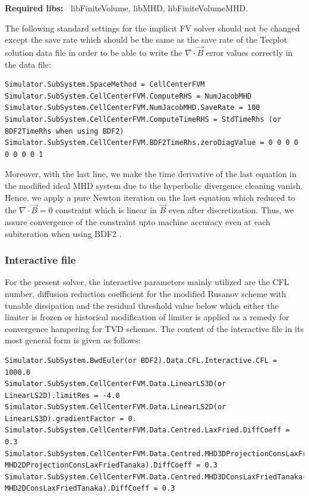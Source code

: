 \documentclass[11pt]{article}
\begin{document}
{\bf Required libs:~} libFiniteVolume, libMHD, libFiniteVolumeMHD.

The following standard settings for the implicit FV solver should not be changed except the save rate which should be the same as the save rate of the Tecplot solution data file in order to be able to write the $\nabla\cdot\vec{B}$ error values correctly in the data file:

\begin{lstlisting}[breaklines]
Simulator.SubSystem.SpaceMethod = CellCenterFVM
Simulator.SubSystem.CellCenterFVM.ComputeRHS = NumJacobMHD
Simulator.SubSystem.CellCenterFVM.NumJacobMHD.SaveRate = 100
Simulator.SubSystem.CellCenterFVM.ComputeTimeRHS = StdTimeRhs (or BDF2TimeRhs when using BDF2)
Simulator.SubSystem.CellCenterFVM.BDF2TimeRhs.zeroDiagValue = 0 0 0 0 0 0 0 0 1
\end{lstlisting}
Moreover, with the last line, we make the time derivative of the last equation in the modified ideal MHD system due to the hyperbolic divergence cleaning vanish. Hence, we apply a pure Newton iteration on the last equation which reduced to the $\nabla\cdot\vec{B}=0$ constraint which is linear in $\vec{B}$ even after discretization. Thus, we assure convergence of the constraint upto machine accuracy even at each subiteration when using BDF2 \cite{yalim11jcp}.

\subsubsection{Interactive file}

For the present solver, the interactive parameters mainly utilized are the CFL number, diffusion reduction coefficient for the modified Rusanov scheme with tunable dissipation and the residual threshold value below which either the limiter is frozen or historical modification of limiter is applied as a remedy for convergence hampering for TVD schemes. The content of the interactive file in its most general form is given as follows:

\begin{lstlisting}[breaklines]
Simulator.SubSystem.BwdEuler(or BDF2).Data.CFL.Interactive.CFL = 1000.0
Simulator.SubSystem.CellCenterFVM.Data.LinearLS3D(or LinearLS2D).limitRes = -4.0
Simulator.SubSystem.CellCenterFVM.Data.LinearLS2D(or LinearLS3D).gradientFactor = 0.
Simulator.SubSystem.CellCenterFVM.Data.Centred.LaxFried.DiffCoeff = 0.3
Simulator.SubSystem.CellCenterFVM.Data.Centred.MHD3DProjectionConsLaxFriedTanaka(or MHD2DProjectionConsLaxFriedTanaka).DiffCoeff = 0.3
Simulator.SubSystem.CellCenterFVM.Data.Centred.MHD3DConsLaxFriedTanaka(or MHD2DConsLaxFriedTanaka).DiffCoeff = 0.3
\end{lstlisting}
\end{document}
